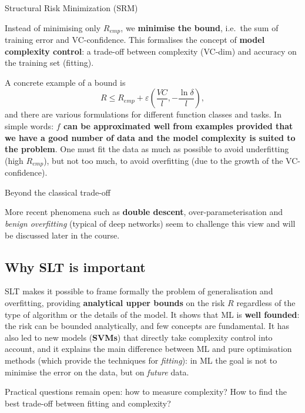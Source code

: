 \begin{boxdefinition}{Structural Risk Minimization (SRM)}

Instead of minimising only \(R_{emp}\), we \textbf{minimise the bound},
i.e.\ the sum of training error and VC-confidence. This formalises the
concept of \textbf{model complexity control}: a trade-off between
complexity (VC-dim) and accuracy on the training set (fitting).

\end{boxdefinition}

A concrete example of a bound is \[
R \le R_{emp} + \varepsilon\left(\frac{VC}{l}, -\frac{\ln\delta}{l}\right),
\] and there are various formulations for different function classes
and tasks. In simple words: \textbf{\(f\) can be approximated well from
examples provided that we have a good number of data and the model
complexity is suited to the problem}. One must fit the data as much as
possible to avoid underfitting (high \(R_{emp}\)), but not too much, to
avoid overfitting (due to the growth of the VC-confidence).

\begin{boxnote}{Beyond the classical trade-off}

More recent phenomena such as \textbf{double descent},
over-parameterisation and \emph{benign overfitting} (typical of deep
networks) seem to challenge this view and will be discussed later in
the course.

\end{boxnote}

\subsection{Why SLT is
important}\label{perchuxe9-la-slt-uxe8-importante}

SLT makes it possible to frame formally the problem of generalisation
and overfitting, providing \textbf{analytical upper bounds} on the risk
\(R\) regardless of the type of algorithm or the details of the model.
It shows that ML is \textbf{well founded}: the risk can be bounded
analytically, and few concepts are fundamental. It has also led to new
models (\textbf{SVMs}) that directly take complexity control into
account, and it explains the main difference between ML and pure
optimisation methods (which provide the techniques for
\emph{fitting}): in ML the goal is not to minimise the error on the
data, but on \emph{future} data.

Practical questions remain open: how to measure complexity? How to find
the best trade-off between fitting and complexity?

